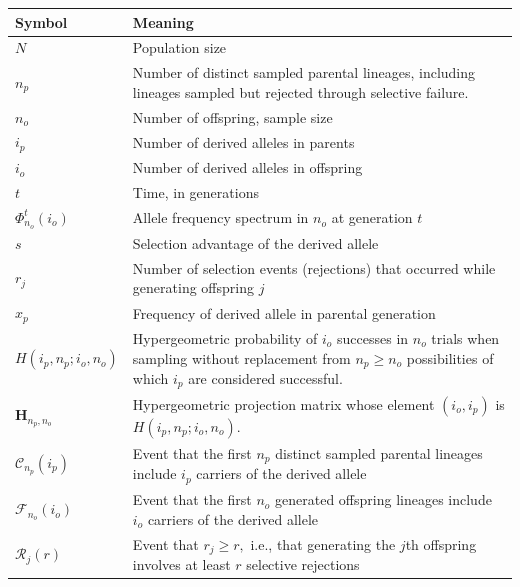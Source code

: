 \documentclass[9pt,twocolumn,twoside,lineno]{gsajnl}
\newcommand{\dslash}{/\!\!/}
\newcommand{\Coalc}[4]{\left(#1, #2 ; #3, #4 \right)}
\newcommand{\sgcomment}[1]{\textcolor{blue}{SG: #1}}
\begin{document}
\begin{table}
  \centering
    \begin{tabular}{l|p{}}
    Symbol & Meaning\\
    \hline
   
    $N$ & Population size\\
    $n_p$ & Number of distinct sampled parental lineages, including lineages sampled but rejected through selective failure.\\
    $n_o$ & Number of offspring, sample size\\
    $i_p$ & Number of derived alleles in parents\\
    $i_o$ & Number of derived alleles in offspring\\
    $t$ & Time, in generations\\
    $\Phi_{n_o}^{t}(i_o)$ & Allele frequency spectrum in $n_o$ at generation $t$\\
    $s$ & Selection advantage of the derived allele\\
    $r_j$ & Number of selection events (rejections) that occurred while generating offspring $j$\\
    $x_p$ & Frequency of derived allele in parental generation\\
    $H\Coalc{i_p}{n_p}{i_o}{n_o}$ &
      Hypergeometric probability of $i_o$ successes in $n_o$ trials when sampling without replacement 
      from $n_p\geq n_o$ possibilities of which $i_p$ are considered successful.
      \\
       $\mathbf{H}_{n_p, n_o}$ &
      Hypergeometric projection matrix whose element $(i_o, i_p)$ is $H\Coalc{i_p}{n_p}{i_o}{n_o}.$
      \\
        \hline
    $\mathcal{C}_{n_p}(i_p)$ & Event that the first $n_p$ distinct sampled parental lineages include $i_p$ carriers of the derived allele \\
     $\mathcal{F}_{n_o}(i_o)$ & Event that the first $n_o$ generated offspring lineages include $i_o$ carriers of the derived allele \\   
    $\mathcal{R}_{j}(r)$ & Event that $r_j \geq r,$ i.e., that generating the $j$th offspring involves at least $r$ selective rejections\\    

\end{tabular}
\end{table}
\end{document}
